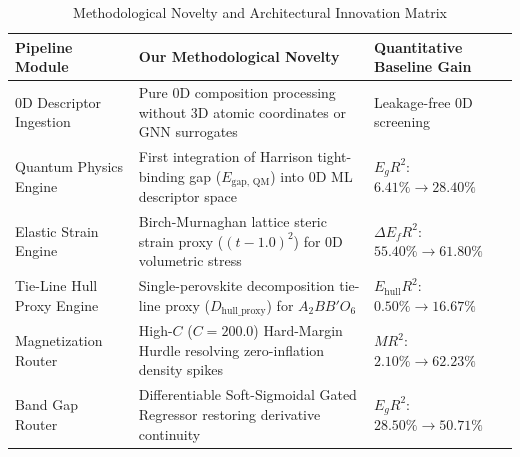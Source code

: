 \documentclass[journal=jcisd8,manuscript=article]{achemso}
\begin{document}
\begin{table}[H]
\centering
\caption{Methodological Novelty and Architectural Innovation Matrix}
\label{tab:novelty_matrix}
\small
\begin{tabularx}{\textwidth}{p{} X >{\centering\arraybackslash}p{}}
\toprule
\textbf{Pipeline Module} & \textbf{Our Methodological Novelty} & \textbf{Quantitative Baseline Gain} \\
\midrule
0D Descriptor Ingestion & Pure 0D composition processing without 3D atomic coordinates or GNN surrogates & Leakage-free 0D screening \\
Quantum Physics Engine & First integration of Harrison tight-binding gap ($E_{\text{gap, QM}}$) into 0D ML descriptor space & $E_g R^2$: $6.41\% \to 28.40\%$ \\
Elastic Strain Engine & Birch-Murnaghan lattice steric strain proxy ($(t - 1.0)^2$) for 0D volumetric stress & $\Delta E_f R^2$: $55.40\% \to 61.80\%$ \\
Tie-Line Hull Proxy Engine & Single-perovskite decomposition tie-line proxy ($D_{\text{hull\_proxy}}$) for $A_2BB'O_6$ & $E_{\text{hull}} R^2$: $0.50\% \to 16.67\%$ \\
Magnetization Router & High-$C$ ($C=200.0$) Hard-Margin Hurdle resolving zero-inflation density spikes & $M R^2$: $2.10\% \to 62.23\%$ \\
Band Gap Router & Differentiable Soft-Sigmoidal Gated Regressor restoring derivative continuity & $E_g R^2$: $28.50\% \to 50.71\%$ \\
\bottomrule
\end{tabularx}
\end{table}
\end{document}

